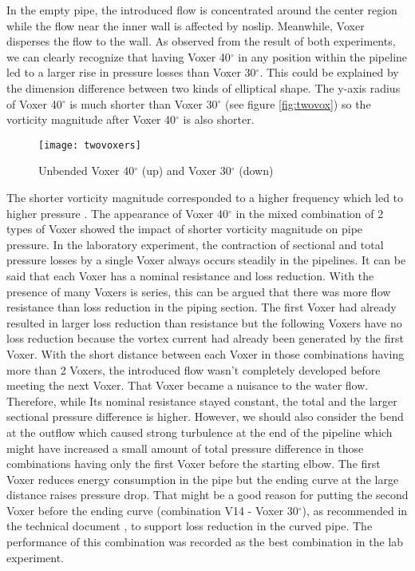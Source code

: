 In the empty pipe, the introduced flow is concentrated around the center region while the flow near the inner wall is affected by \gls{noslip}. Meanwhile, Voxer disperses the flow to the wall. As observed from the result of both experiments, we can clearly recognize that having Voxer 40$^{\circ}$ in any position within the pipeline led to a larger rise in pressure losses than Voxer 30$^{\circ}$. This could be explained by the dimension difference between two kinds of elliptical shape. The y-axis radius of Voxer 40$^{\circ}$ is much shorter than Voxer 30$^{\circ}$  (see figure \vref{fig:twovox}) so the vorticity magnitude after Voxer 40$^{\circ}$ is also shorter. 
\begin{wrapfigure}{r}{0.4\textwidth}
  \begin{center}
    \texttt{[image: twovoxers]}
  \end{center}
  \caption{Unbended Voxer 40$^{\circ}$ (up) and Voxer 30$^{\circ}$ (down)}
  \label{fig:twovox}
\end{wrapfigure}
The shorter vorticity magnitude corresponded to a higher frequency which led to higher pressure \cite{scz:article}. The appearance of Voxer 40$^{\circ}$ in the mixed combination of 2 types of Voxer showed the impact of shorter vorticity magnitude on pipe pressure.
In the laboratory experiment, the contraction of sectional and total pressure losses by a single Voxer always occurs steadily in the pipelines. It can be said that each Voxer has a nominal resistance and loss reduction. With the presence of many Voxers is series, this can be argued that there was more flow resistance than loss reduction in the piping section. The first Voxer had already resulted in larger loss reduction than resistance but the following Voxers have no loss reduction because the vortex current had already been generated by the first Voxer. With the short distance between each Voxer in those combinations having more than 2 Voxers, the introduced flow wasn't completely developed before meeting the next Voxer. That Voxer became a nuisance to the water flow. Therefore, while Its nominal resistance stayed constant, the total and the larger sectional pressure difference is higher. 
However, we should also consider the bend at the outflow which caused strong turbulence at the end of the pipeline which might have increased a small amount of total pressure difference in those combinations having only the first Voxer before the starting elbow. The first Voxer reduces energy consumption in the pipe but the ending curve at the large distance raises pressure drop. That might be a good reason for putting the second Voxer before the ending curve (combination V14 - Voxer 30$^{\circ}$), as recommended in the technical document \cite{voxer:article}, to support loss reduction in the curved pipe. The performance of this combination was recorded as the best combination in the lab experiment. 

